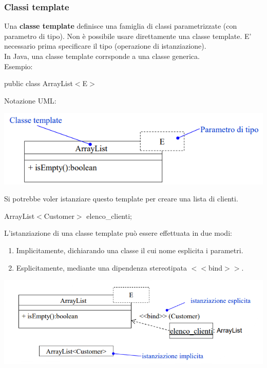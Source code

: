 \documentclass{article}
\begin{document}
	\subsubsection{Classi template}
	Una \textbf{classe template} definisce una famiglia di classi parametrizzate (con parametro di tipo). Non è possibile usare direttamente una classe template. E' necessario prima specificare il tipo (operazione di istanziazione). \\
	In Java, una classe template corrsponde a una classe generica.
	\vspace{\baselineskip} \\
	Esempio:
	\begin{center}
		public class ArrayList$<$E$>$
	\end{center}
	Notazione UML:
	\begin{center}
		\includegraphics[scale=0.7]{assets/uml_classe_template.png}
	\end{center}
	Si potrebbe voler istanziare questo template per creare una lista di clienti.
	\begin{center}
		ArrayList$<$Customer$>$ elenco\_clienti;
	\end{center}
	L'istanziazione di una classe template può essere effettuata in due modi:
	\begin{enumerate}
		\item Implicitamente, dichiarando una classe il cui nome esplicita i parametri.
		\item Esplicitamente, mediante una dipendenza stereotipata $<<$bind$>>$.
	\end{enumerate}
	\begin{center}
		\includegraphics[scale=0.7]{assets/uml_classe_template_2.png}
	\end{center}
\end{document}
